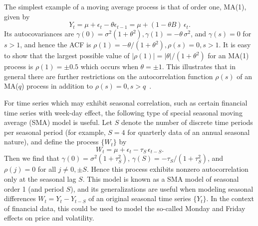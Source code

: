 \begin{ex} \label{ex:movingorder1}
The simplest example of a moving average process is that of order one, MA(1), given by
	\[
	Y_t = \mu + \epsilon_t - \theta \epsilon_{t-1}= \mu + (1 - \theta B)\, \epsilon_t.
	 \]
Its autocovariances are $\gamma(0)= \sigma^2 (1 + \theta^2), \gamma(1)= -\theta\, \sigma^2$, and $\gamma(s)= 0$ for $s > 1$, and hence the ACF is $\rho(1)= -\theta / (1+\theta^2), \rho(s)= 0, s > 1$. It is easy to show that the largest possible value of $\left| \rho(1) \right|= \left| \theta \right| / (1+\theta^2)$ for an  MA(1) process is $\rho(1)= \pm 0.5$ which occurs when $\theta = \pm 1$. This illustrates that in general there are further restrictions on the autocorrelation function $\rho(s)$ of an MA($q$)  process in addition to $\rho(s)= 0, s > q$~.~\xqed
\end{ex}
    

\begin{ex} \label{ex:seasonal} 
For time series which may exhibit seasonal correlation, such as certain financial time series with week-day effect, the following type of special seasonal moving average (SMA) model is useful. Let $S$ denote the number of discrete time periods per seasonal period (for example, $S= 4$ for quarterly data of an annual seasonal nature), and define the process $\{ W_t \}$ by
	\[	
	W_t = \mu + \epsilon_t - \tau_S \, \epsilon_{t-S}.
	\]
Then we find that $\gamma(0)= \sigma^2 (1+\tau_S^2)$, $\gamma(S) = - \tau_S / (1+\tau_S^2)$,  and $\rho(j)= 0$ for all $j \neq 0, \pm S$. Hence this process exhibits nonzero autocorrelation only at the seasonal lag $S$. This model is known as a SMA model of seasonal order 1 (and period $S$), and its generalizations are useful when modeling seasonal differences $W_t = Y_t - Y_{t-S}$ of an original seasonal time series $\{ Y_t \}$.  In the context of financial data, this could be used to model the so-called Monday and Friday effects on price and volatility. \xqed
\end{ex}      


